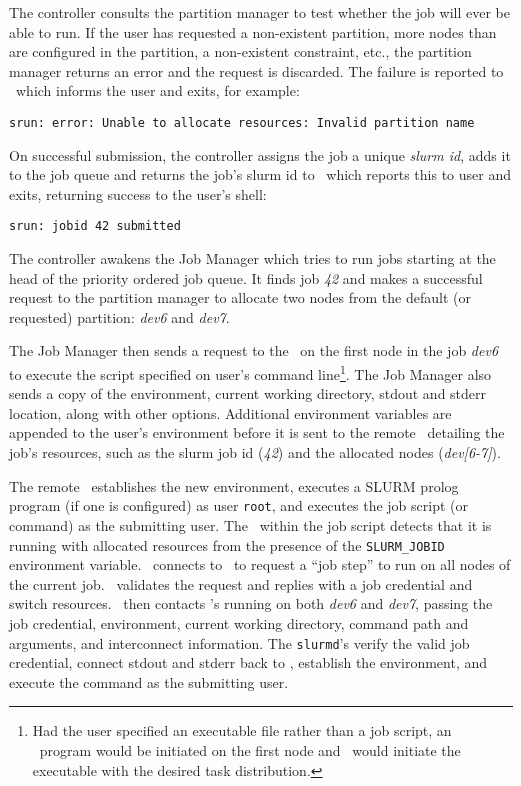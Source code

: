 The controller consults the partition manager to test whether the job 
will ever be able to run.  If the user has requested a non-existent partition,
more nodes than are configured in the partition, a non-existent constraint, 
etc., the partition manager returns an error and the request is discarded.
The failure is reported to \srun\ which informs the user and exits, for example:
\begin{verbatim}
srun: error: Unable to allocate resources: Invalid partition name
\end{verbatim}

On successful submission, the controller assigns the job a unique 
{\em slurm id}, adds it to the job queue and returns the job's
slurm id to \srun\, which reports this to user and exits, returning
success to the user's shell:

\begin{verbatim}
srun: jobid 42 submitted
\end{verbatim}

The controller awakens the Job Manager which tries to run
jobs starting at the head of the priority ordered job queue.  
It finds job {\em 42}
and makes a successful request to the partition manager to allocate 
two nodes from the default (or requested) partition: {\em dev6} and 
{\em dev7}.

The Job Manager then sends a request to the \slurmd\ on the first node 
in the job {\em dev6} to execute the script specified on user's
command line\footnote{Had the user specified an executable file rather 
than a job script, an \srun\ program would be initiated on the first 
node and \srun\ would initiate the executable with the desired task distribution.}.
The Job Manager also sends a 
copy of the environment, current working directory, stdout and stderr location,
along with other options. Additional environment variables are appended
to the user's environment before it is sent to the remote \slurmd\ detailing
the job's resources, such as the slurm job id ({\em 42}) and the
allocated nodes ({\em dev[6-7]}).

The remote \slurmd\ establishes the new environment, executes a SLURM 
prolog program (if one is configured) as user {\tt root}, and executes the
job script (or command) as the submitting user. The \srun\ within the job script 
detects that it is running with allocated resources from the presence
of the {\tt SLURM\_JOBID} environment variable. \srun\ connects to
\slurmctld\ to request a ``job step'' to run on all nodes of the current
job. \slurmctld\ validates the request and replies with a job credential
and switch resources. \srun\ then contacts \slurmd 's running on both
{\em dev6} and {\em dev7}, passing the job credential, environment,
current working directory, command path and arguments, and interconnect
information. The {\tt slurmd}'s verify the valid job credential, connect
stdout and stderr back to \srun , establish the environment, and execute
the command as the submitting user.

